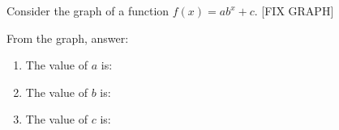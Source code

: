 \documentclass{ximera}
\author{Ivo Terek}
\begin{document}
\begin{exercise}

 Consider the graph of a function $f(x) = ab^x+c$. [FIX GRAPH]


 From the graph, answer:

 \begin{enumerate}
 \item The value of $a$ is:
   \begin{multipleChoice}
   \end{multipleChoice}
 \item The value of $b$ is:
   \begin{multipleChoice}
   \end{multipleChoice}
 \item  The value of $c$ is:
   \begin{multipleChoice}
   \end{multipleChoice}
 \end{enumerate}

\end{exercise}
\end{document}
